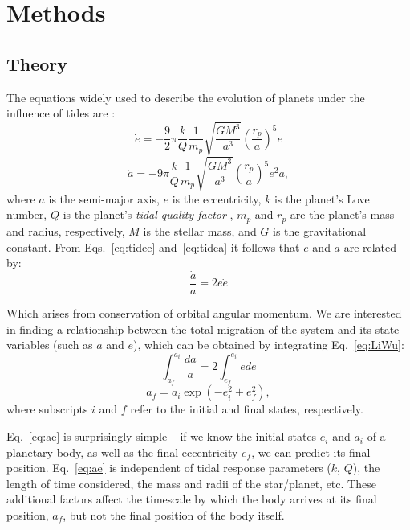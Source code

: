 \section{Methods}
\label{sec:meth}
\subsection{Theory}
\label{sec: Theory}
The equations widely used to describe the evolution of planets under the influence of tides are \citep[e.g.][]{Barnes2008, LithwickWu2012,Lee2013}:
\begin{equation}
\dot{e} = -\frac{9}{2}\pi \frac{k}{Q} \frac{1}{m_p} \sqrt{\frac{GM^3}{a^3}} \left(\frac{r_p}{a} \right)^5 e
\label{eq:tidee}
\end{equation}
\begin{equation}
\dot{a} = -9\pi \frac{k}{Q} \frac{1}{m_p} \sqrt{\frac{GM^3}{a^3}} \left(\frac{r_p}{a} \right)^5 e^2 a,
\label{eq:tidea}
\end{equation}
where $a$ is the semi-major axis, $e$ is the eccentricity, $k$ is the planet's Love number, $Q$ is the planet's \textit{tidal quality factor} \citep{Goldreich1966}, $m_p$ and $r_p$ are the planet's mass and radius, respectively, $M$ is the stellar mass, and $G$ is the gravitational constant. 
From Eqs.~\ref{eq:tidee} and~\ref{eq:tidea} it follows that $\dot{e}$ and $\dot{a}$ are related by:
\begin{equation}
\frac{\dot{a}}{a} = 2e\dot{e}
\label{eq:LiWu}
\end{equation}

Which arises from conservation of orbital angular momentum.
We are interested in finding a relationship between the total migration of the system and its state variables (such as $a$ and $e$), which can be obtained by integrating Eq.~\ref{eq:LiWu}: 
\begin{equation*}
\int_{a_f}^{a_i} \frac{da}{a} = 2\int_{e_f}^{e_i} ede
\end{equation*}
\begin{equation}
a_f  = a_i \exp(- e_i^2 + e_f^2),
\label{eq:ae}
\end{equation}
where subscripts $i$ and $f$ refer to the initial and final states, respectively. 

Eq.~\ref{eq:ae} is surprisingly simple -- if we know the initial states $e_i$ and $a_i$ of a planetary body, as well as the final eccentricity $e_f$, we can predict its final position. 
Eq.~\ref{eq:ae} is independent of tidal response parameters ($k$, $Q$), the length of time considered, the mass and radii of the star/planet, etc. 
These additional factors affect the timescale by which the body arrives at its final position, $a_f$, but not the final position of the body itself. 

